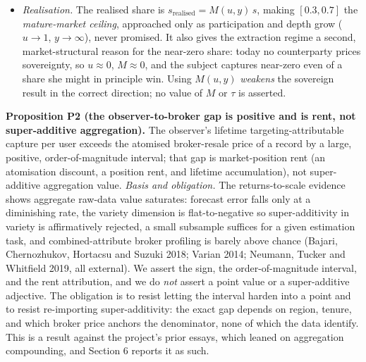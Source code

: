 \documentclass[
  11pt,
]{article}
\newcounter{none} %
\begin{document}
\begin{itemize}
  1986; Sutton 1986). With X proposing first the subgame-perfect share
  is interior for any discount factors, and in the frictionless limit
  equals X's bargaining power \(\beta = \rho_M/(\rho_X+\rho_M) \in
  (0,1)\). The interior interval \([0.3, 0.7]\) of Section 5.1 is the
  image of \(\beta\) over a bounded, roughly symmetric range of relative
  patience (neither party more than about \(2.3\) times as impatient as
  the other): \(0.5\) symmetric, \(0.3\) counterparty-favourable,
  \(0.7\) subject-favourable. It is a bargaining projection with a
  stated precondition, not a measured or guessed band; no deployed
  sovereignty market has been observed to price \(s\) (Section 6), and
  we port no value of \(\beta\).
\item
  \emph{Realisation.} The realised share is
  \(s_{\text{realised}} = M(u,y)\, s\), making \([0.3,0.7]\) the
  \emph{mature-market ceiling}, approached only as participation and
  depth grow (\(u \to 1\), \(y \to \infty\)), never promised. It also
  gives the extraction regime a second, market-structural reason for the
  near-zero share: today no counterparty prices sovereignty, so
  \(u \approx 0\), \(M \approx 0\), and the subject captures near-zero
  even of a share she might in principle win. Using \(M(u,y)\)
  \emph{weakens} the sovereign result in the correct direction; no value
  of \(M\) or \(\tau\) is asserted.
\end{itemize}

\textbf{Proposition P2 (the observer-to-broker gap is positive and is
rent, not super-additive aggregation).} The observer's lifetime
targeting-attributable capture per user exceeds the atomised
broker-resale price of a record by a large, positive, order-of-magnitude
interval; that gap is market-position rent (an atomisation discount, a
position rent, and lifetime accumulation), not super-additive
aggregation value. \emph{Basis and obligation.} The returns-to-scale
evidence shows aggregate raw-data value saturates: forecast error falls
only at a diminishing rate, the variety dimension is flat-to-negative so
super-additivity in variety is affirmatively rejected, a small subsample
suffices for a given estimation task, and combined-attribute broker
profiling is barely above chance (Bajari, Chernozhukov, Hortacsu and
Suzuki 2018; Varian 2014; Neumann, Tucker and Whitfield 2019, all
external). We assert the sign, the order-of-magnitude interval, and the
rent attribution, and we do \emph{not} assert a point value or a
super-additive adjective. The obligation is to resist letting the
interval harden into a point and to resist re-importing
super-additivity: the exact gap depends on region, tenure, and which
broker price anchors the denominator, none of which the data identify.
This is a result against the project's prior essays, which leaned on
aggregation compounding, and Section 6 reports it as such.
\end{document}
